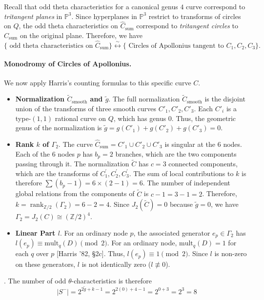 \documentclass[11pt,a4paper]{article}
\newcommand{\gtilde}{\widetilde{g}}
\newcommand{\rank}{\operatorname{rank}}
\newcommand{\PP}{\mathbb{P}}
\newcommand{\ZZ}{\mathbb{Z}}
\theoremstyle{mytheoremstyle}
\theoremstyle{mydefinitionstyle}
\newcommand{\HarrisThetaCite}[1]{[Harris '82, \S#1]}
\begin{document}
Recall that odd theta characteristics for a canonical genus $4$ curve correspond to \textit{tritangent planes} in $\PP^3$. Since hyperplanes in $\PP^3$ restrict to transforms of circles on $Q$, the odd theta characteristics on $\hat{C}_\text{sum}$ correspond to \textit{tritangent circles} to $C_\text{sum}$ on the original plane. Therefore, we have $$\bigl\{\text{ odd theta characteristics on }\hat{C}_\text{sum} \bigr\} \overset{\sim}{\leftrightarrow} \bigl\{\text{ Circles of Apollonius tangent to } C_1, C_2, C_3\bigr\}.$$

\paragraph{Monodromy of Circles of Apollonius.}
We now apply Harris's counting formulas to this specific curve $C$. 
\begin{itemize}
    \item \textbf{Normalization $\widetilde{C}_\text{smooth}$ and $\gtilde$}. The full normalization $\widetilde{C}_\text{smooth}$ is the disjoint union of the transforms of three smooth curves $C'_1, C'_2, C'_3$. Each $C'_i$ is a type-$(1,1)$ rational curve on $Q$, which has genus $0$. Thus, the geometric genus of the normalization is $\gtilde = g(C'_1) + g(C'_2) + g(C'_3) = 0$.
    \item \textbf{Rank $k$ of $\Gamma_2$}. The curve $ \hat{C}_\text{sum}= C'_1 \cup C'_2 \cup C'_3$ is singular at the $6$ nodes. Each of the 6 nodes $p$ has $b_p=2$ branches, which are the two components passing through it. The normalization $\widetilde{C}$ has $c=3$ connected components, which are the transforms of $C_1^\prime,C_2^\prime, C_3^\prime$. The sum of local contributions to $k$ is therefore $\sum (b_p-1) = 6 \times (2-1) = 6$. The number of independent global relations from the components of $\widetilde{C}$ is $c-1 = 3-1=2$. Therefore, $k = \rank_{\ZZ/2}(\Gamma_2) = 6 - 2 = 4$. Since $J_2(\widetilde{C}) = 0$ because $\gtilde=0$, we have $\Gamma_2 = J_2(C) \cong (\ZZ/2)^4$.
    \item \textbf{Linear Part $l$}. For an ordinary node $p$, the associated generator $e_p \in \Gamma_2$ has $l(e_p) \equiv \text{mult}_q(D) \pmod 2$. For an ordinary node, $\text{mult}_q(D)=1$ for each $q$ over $p$ \HarrisThetaCite{2c}. Thus, $l(e_p) \equiv 1 \pmod 2$. Since $l$ is non-zero on these generators, $l$ is not identically zero ($l \not\equiv 0$).
\end{itemize}. 
The number of odd $\theta$-characteristics is therefore
\[ |S^-| = 2^{2\gtilde + k - 1} = 2^{2(0) + 4 - 1} = 2^{0 + 3} = 2^3 = 8 \]
\end{document}
